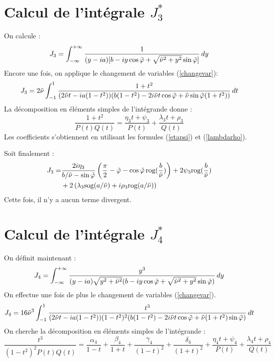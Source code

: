 \section{Calcul de l'intégrale $J_3^*$}
\label{calculJ3}
On calcule :
\begin{equation}
J_3 = \int_{-\infty}^{+\infty} \frac{1}{(y-ia)\lbrack b-iy\cos \tilde{\varphi}+  \sqrt{\tilde{\nu}^2+y^2} \sin \tilde{\varphi} \rbrack} \, dy
\label{defJ3}
\end{equation}
Encore une fois, on applique le changement de variables (\ref{changevar}):
$$J_3= 2\tilde{\nu} \int_{-1}^1 \frac{1+t^2}{(2\tilde{\nu} t-ia(1-t^2))(b(1-t^2)-2i\tilde{\nu} t\cos\tilde{\varphi}+\tilde{\nu}\sin\tilde{\varphi}(1+t^2))} \, dt$$
La décomposition en éléments simples de l'intégrande donne :
$$\frac{1+t^2}{P(t)Q(t)}=\frac{\eta_3 t+\psi_3}{P(t)}+\frac{\lambda_3 t +\rho_3}{Q(t)}$$
Les coefficients s'obtiennent en utilisant les formules (\ref{etapsi}) et (\ref{lambdarho}).

Soit finalement :
\begin{equation}
\begin{split}
J_3=&\frac{2i\eta_3}{b/\tilde{\nu}-\sin\tilde{\varphi}}\left(\frac{\pi}{2}-\tilde{\varphi}-\cos\tilde{\varphi} \,\mbox{rog}(\frac{b}{\tilde{\nu}}) \right)+2\psi_3 \mbox{rog}(\frac{b}{\tilde{\nu}} )\\
&+2\left(\lambda_3 \mbox{sog}(a/\tilde{\nu})+i\rho_3 \mbox{rog}(a/\tilde{\nu}) \right)
\end{split}
\label{valJ3}
\end{equation}
Cette fois, il n'y a aucun terme divergent. 

\section{Calcul de l'intégrale $J_4^*$}
\label{calculJ4}
On définit maintenant :
\begin{equation}
J_4=\int_{-\infty}^{+\infty}\frac{y^3}{(y-ia)\sqrt{y^2+\tilde{\nu}^2}(b-iy\cos\tilde{\varphi}+\sqrt{\tilde{\nu}^2+y^2}\sin\tilde{\varphi})}\,dy
\label{defJ4}
\end{equation}
On effectue une fois de plus le changement de variables (\ref{changevar}).
$$J_4=16\tilde{\nu}^3 \int_{-1}^1 \frac{t^3}{(2\tilde{\nu} t-ia(1-t^2))(1-t^2)^2(b(1-t^2)-2i\tilde{\nu} t\cos\tilde{\varphi}+\tilde{\nu}(1+t^2)\sin\tilde{\varphi})} \, dt $$
On cherche la décomposition en éléments simples de l'intégrande :
\begin{equation*}
\frac{t^3}{(1-t^2)^2P(t)Q(t)}=\frac{\alpha_4}{1-t}+\frac{\beta_4}{1+t}+\frac{\gamma_4}{(1-t)^2}+\frac{\delta_4}{(1+t)^2}+\frac{\eta_4 t+\psi_4}{P(t)}+\frac{\lambda_4 t +\rho_4}{Q(t)}
\end{equation*}

